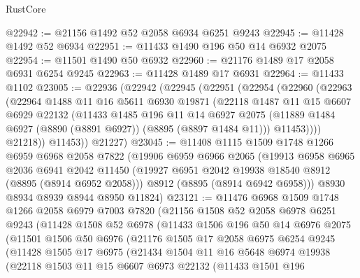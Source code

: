 \begin{lexlean}{RustCore}
\begin{coremodule}
@22942 := @21156 @1492 @52 @2058 @6934 @6251 @9243
@22945 := @11428 @1492 @52 @6934
@22951 := @11433 @1490 @196 @50 @14 @6932 @2075
@22954 := @11501 @1490 @50 @6932
@22960 := @21176 @1489 @17 @2058 @6931 @6254 @9245
@22963 := @11428 @1489 @17 @6931
@22964 := @11433 @1102
@23005 := @22936
    (@22942
      (@22945
        (@22951
          (@22954
            (@22960
              (@22963
                (@22964
                  @1488
                  @11
                  @16
                  @5611
                  @6930
                  @19871
                  (@22118
                    @1487
                    @11
                    @15
                    @6607
                    @6929
                    @22132
                    (@11433
                      @1485
                      @196
                      @11
                      @14
                      @6927
                      @2075
                      (@11889 @1484 @6927 (@8890 (@8891 @6927)) (@8895 (@8897 @1484 @11)))
                      @11453))))
              @21218))
          @11453))
      @21227)
@23045 := @11408
    @1115
    @1509
    @1748
    @1266
    @6959
    @6968
    @2058
    @7822
    (@19906
      @6959
      @6966
      @2065
      (@19913
        @6958
        @6965
        @2036
        @6941
        @2042
        @11450
        (@19927 @6951 @2042 @19938 @18540 @8912 (@8895 (@8914 @6952 @2058)))
        @8912
        (@8895 (@8914 @6942 @6958)))
      @8930
      @8934
      @8939
      @8944
      @8950
      @11824)
@23121 := @11476
    @6968
    @1509
    @1748
    @1266
    @2058
    @6979
    @7003
    @7820
    (@21156
      @1508
      @52
      @2058
      @6978
      @6251
      @9243
      (@11428
        @1508
        @52
        @6978
        (@11433
          @1506
          @196
          @50
          @14
          @6976
          @2075
          (@11501
            @1506
            @50
            @6976
            (@21176
              @1505
              @17
              @2058
              @6975
              @6254
              @9245
              (@11428
                @1505
                @17
                @6975
                (@21434
                  @1504
                  @11
                  @16
                  @5648
                  @6974
                  @19938
                  (@22118
                    @1503
                    @11
                    @15
                    @6607
                    @6973
                    @22132
                    (@11433
                      @1501
                      @196

\end{coremodule}
\end{lexlean}
